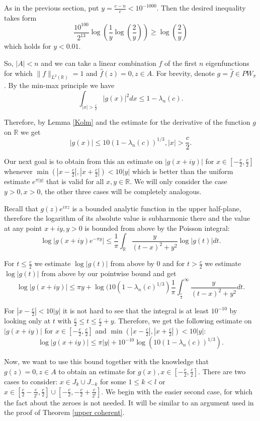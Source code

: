 \documentclass[12pt]{amsart}
\numberwithin{equation}{section}
\newcommand{\R}{\mathbb{R}}
\begin{document}
As in the previous section, put $y = \frac{c-n}{c} < 10^{-1000}$. Then the desired inequality takes form
$$\frac{10^{100}}{2^{13}}\log\left(\frac{1}y{\log\left(\frac{2}{y}\right)}\right) \ge \log\left(\frac{2}{y}\right)$$
which holds for $y < 0.01$.

So, $|A| < n$ and we can take a linear combination $f$ of the first $n$ eigenfunctions for which $\|f\|_{L^2(\R)}=1$ and $\hat{f}(z)=0,z\in A$. For brevity, denote $g=\hat{f}\in PW_\pi$. By the min-max principle we have
$$\int_{|x| > \frac{c}{2}}|g(x)|^2dx \le 1-\lambda_n(c).$$

Therefore, by Lemma \ref{Kolm} and the estimate for the derivative of the function $g$ on $\R$ we get
$$|g(x)|\le 10(1-\lambda_n(c))^{1/3}, |x| > \frac{c}{2}.$$

Our next goal is to obtain from this an estimate on $|g(x+iy)|$ for $x\in [-\frac{c}{2},\frac{c}{2}]$ whenever $\min\left(|x-\frac{c}{2}|,|x+\frac{c}{2}|\right)< 10|y|$ which is better than the uniform estimate $e^{\pi |y|}$ that is valid for all $x,y\in\R$. We will only consider the case $y > 0, x > 0$, the other three cases will be completely analogous. 

Recall that $g(z)e^{i\pi z}$ is a bounded analytic function in the upper half-plane, therefore the logarithm of its absolute value is subharmonic there and the value at any point $x+iy, y > 0$ is bounded from above by the Poisson integral:
$$\log |g(x+iy)e^{-\pi y}|\le \frac{1}{\pi}\int_\R \frac{y}{(t-x)^2+y^2}\log |g(t)|dt.$$

For $t \le \frac{c}{2}$ we estimate $\log |g(t)|$ from above by $0$ and for $t > \frac{c}{2}$ we estimate $\log |g(t)|$ from above by our pointwise bound and get
$$\log |g(x+iy)| \le \pi y + \log(10(1-\lambda_n(c)^{1/3})\frac{1}{\pi}\int_{\frac{c}{2}}^\infty \frac{y}{(t-x)^2+y^2}dt.$$

For $ |x-\frac{c}{2}| < 10 |y|$ it is not hard to see that the integral is at least $10^{-10}$ by looking only at $t$ with $\frac{c}{2}\le t \le \frac{c}{2} + y$. Therefore, we get the following estimate on $|g(x+iy)|$ for $x\in [-\frac{c}{2},\frac{c}{2}]$ and $\min\left(|x-\frac{c}{2}|,|x+\frac{c}{2}|\right)< 10|y|$:
$$\log |g(x+iy)| \le \pi |y| + 10^{-10}\log(10(1-\lambda_n(c))^{1/3}).$$

Now, we want to use this bound together with the knowledge that $g(z) = 0, z\in A$ to obtain an estimate for $g(x), x\in [-\frac{c}{2},\frac{c}{2}]$. There are two cases to consider: $x\in J_k\cup J_{-k}$ for some $1\le k < l$ or $x\in [\frac{c}{2}-\frac{c}{2^{l}}, \frac{c}{2}]\cup [-\frac{c}{2}, -\frac{c}{2}+\frac{c}{2^{l}}]$. We begin with the easier second case, for which the fact about the zeroes is not needed. It will be similar to an argument used in the proof of Theorem \ref{upper coherent}.
\end{document}
